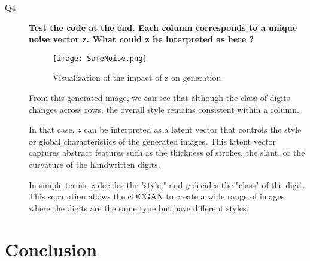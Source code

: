 \documentclass{rapportECL}
\begin{document}
\begin{description}
    
    \item[Q4 ] \textbf{Test the code at the end. Each column corresponds to a unique noise vector z. What could z be interpreted as here ?}

    \begin{figure}[H]
    \centering
    \texttt{[image: SameNoise.png]}
    \caption{Visualization of the impact of z on generation}
    \end{figure}

    From this generated image, we can see that although the class of digits changes across rows, the overall style remains consistent within a column.
    
    In that case, $z$ can be interpreted as a latent vector that controls the style or global characteristics of the generated images. This latent vector captures abstract features such as the thickness of strokes, the slant, or the curvature of the handwritten digits.
    
    In simple terms, $z$ decides the "style," and $y$ decides the "class" of the digit. This separation allows the cDCGAN to create a wide range of images where the digits are the same type but have different styles.


\end{description}

\section{Conclusion}
\end{document}
